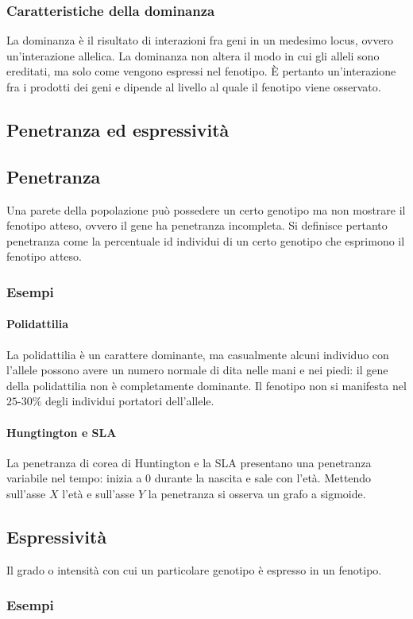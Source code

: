 \subsubsection{Caratteristiche della dominanza}
La dominanza \`e il risultato di interazioni fra geni in un medesimo locus, ovvero un'interazione allelica. La dominanza non altera il modo in cui gli alleli sono ereditati, ma solo come vengono
espressi nel fenotipo. \`E pertanto un'interazione fra i prodotti dei geni e dipende al livello al quale il fenotipo viene osservato. 
\subsection{Penetranza ed espressivit\`a}
\subsection{Penetranza}
Una parete della popolazione pu\`o possedere un certo genotipo ma non mostrare il fenotipo atteso, ovvero il gene ha penetranza incompleta. Si definisce pertanto penetranza come la percentuale id 
individui di un certo genotipo che esprimono il fenotipo atteso.
\subsubsection{Esempi}
\paragraph{Polidattilia}
La polidattilia \`e un carattere dominante, ma casualmente alcuni individuo con l'allele possono avere un numero normale di dita nelle mani e nei piedi: il gene della polidattilia non \`e completamente
dominante. Il fenotipo non si manifesta nel $25$-$30\%$ degli individui portatori dell'allele.
\paragraph{Hungtington e SLA}
La penetranza di corea di Huntington e la SLA presentano una penetranza variabile nel tempo: inizia a $0$ durante la nascita e sale con l'et\`a. Mettendo sull'asse $X$ l'et\`a e sull'asse $Y$ la
penetranza si osserva un grafo a sigmoide.
\subsection{Espressivit\`a}
Il grado o intensit\`a con cui un particolare genotipo \`e espresso in un fenotipo.
\subsubsection{Esempi}
